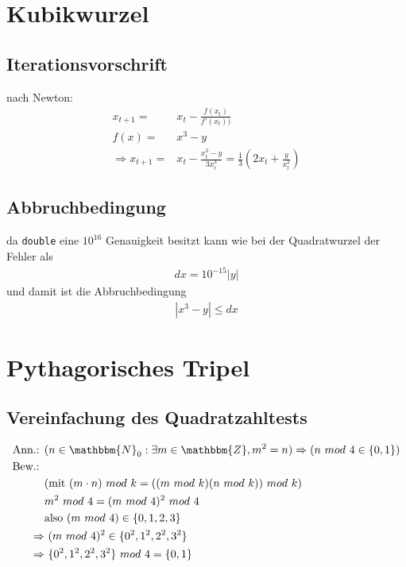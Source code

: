 \documentclass[12pt,a4paper]{article}
\begin{document}
	\section{Kubikwurzel}
		\subsection{Iterationsvorschrift}
			nach Newton: 
			\begin{align}
				x_{t+1} =& x_t - \frac{f(x_t)}{f'(x_t))}\\
				f(x) =& x^3 - y\\
				\Rightarrow x_{t+1} =& x_t - \frac{x_t^3-y}{3x_t^3} = \frac{1}{3} \left( 2x_t + \frac{y}{x_t^2} \right)
			\end{align}
		
		\subsection{Abbruchbedingung}
			da \texttt{double} eine $10^{16}$ Genauigkeit besitzt kann wie bei der Quadratwurzel der Fehler als
			\begin{align}
				dx = 10^{-15}|y|
			\end{align}
			und damit ist die Abbruchbedingung
			\begin{align}
				|x^3-y| \leq dx
			\end{align}
			
	\section{Pythagorisches Tripel}
		\subsection{Vereinfachung des Quadratzahltests}
			\begin{align}
				\text{Ann.: }& (n \in \mathbbm{N}_0: \exists m \in \mathbbm{Z}, m^2=n ) \Rightarrow (n\ mod\ 4 \in \{0,1\}) \\
				\text{Bew.: }& \nonumber\\
				&(\text{mit } (m\cdot n)\ mod\ k = ((m\ mod\ k)(n\ mod\ k))\ mod\ k )\\
				&m^2\ mod\ 4=(m\ mod\ 4)^2\ mod\ 4 \\
				&\text{also } (m\ mod\ 4)\in \{ 0,1,2,3 \} \\
				\Rightarrow&\ (m\ mod\ 4)^2\in \{ 0^2, 1^2, 2^2, 3^2 \}\\
				\Rightarrow&\ \{ 0^2, 1^2, 2^2, 3^2 \}\ mod\ 4 = \{0,1\}
			\end{align}
\end{document}
